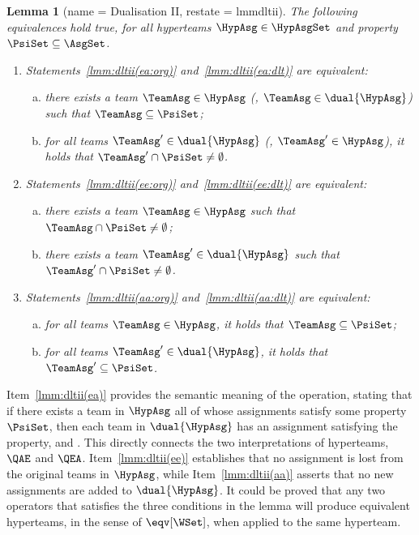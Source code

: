 \documentclass[authoryear]{elsarticle}
\newtheorem{lemma}{Lemma}
\newcommand{\EmpTeamAsg}{\emptyset}
\begin{document}
\begin{lemma}[name = Dualisation II, restate = lmmdltii]
  \label{lmm:dltii}
  The following equivalences hold true, for all hyperteams $\HypAsg \in
  \HypAsgSet$ and property $\PsiSet \subseteq \AsgSet$.
  \begin{enumerate}[1)]
    \item\label{lmm:dltii(ea)}
      Statements~\ref{lmm:dltii(ea:org)} and~\ref{lmm:dltii(ea:dlt)} are
      equivalent:
      \begin{enumerate}[a)]
        \item\label{lmm:dltii(ea:org)}
          there exists a team $\TeamAsg \in \HypAsg$ (\resp, $\TeamAsg \in
          \dual{\HypAsg}$) such that $\TeamAsg \subseteq \PsiSet$;
        \item\label{lmm:dltii(ea:dlt)}
          for all teams $\TeamAsg' \in \dual{\HypAsg}$ (\resp, $\TeamAsg' \in
          \HypAsg$), it holds that $\TeamAsg' \cap \PsiSet \neq \EmpTeamAsg$.
      \end{enumerate}
    \item\label{lmm:dltii(ee)}
      Statements~\ref{lmm:dltii(ee:org)} and~\ref{lmm:dltii(ee:dlt)} are
      equivalent:
      \begin{enumerate}[a)]
        \item\label{lmm:dltii(ee:org)}
          there exists a team $\TeamAsg \in \HypAsg$ such that $\TeamAsg \cap
          \PsiSet \neq \EmpTeamAsg$;
        \item\label{lmm:dltii(ee:dlt)}
          there exists a team $\TeamAsg' \in \dual{\HypAsg}$ such that
          $\TeamAsg' \cap \PsiSet \neq \EmpTeamAsg$.
      \end{enumerate}
    \item\label{lmm:dltii(aa)}
      Statements~\ref{lmm:dltii(aa:org)} and~\ref{lmm:dltii(aa:dlt)} are
      equivalent:
      \begin{enumerate}[a)]
        \item\label{lmm:dltii(aa:org)}
          for all teams $\TeamAsg \in \HypAsg$, it holds that $\TeamAsg
          \subseteq \PsiSet$;
        \item\label{lmm:dltii(aa:dlt)}
          for all teams $\TeamAsg' \in \dual{\HypAsg}$, it holds that $\TeamAsg'
          \subseteq \PsiSet$.
      \end{enumerate}
  \end{enumerate}
\end{lemma}

Item~\ref{lmm:dltii(ea)} provides the semantic meaning of the operation, stating
that if there exists a team in $\HypAsg$ all of whose assignments satisfy some
property $\PsiSet$, then each team in $\dual{\HypAsg}$ has an assignment
satisfying the property, and \viceversa.
This directly connects the two interpretations of hyperteams, $\QAE$ and $\QEA$.
Item~\ref{lmm:dltii(ee)} establishes that no assignment is lost from the
original teams in $\HypAsg$, while Item~\ref{lmm:dltii(aa)} asserts that no new
assignments are added to $\dual{\HypAsg}$.
It could be proved that any two operators that satisfies the three conditions in
the lemma will produce equivalent hyperteams, in the sense of $\eqv[\WSet]$,
when applied to the same hyperteam.
\end{document}
